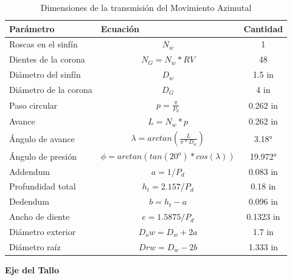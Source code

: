 \begin{table}[H]
	\centering
	\caption{Dimensiones de la transmisión del Movimiento Azimutal}
	\begin{tabular}{|l|c|c|}
		\hline
		\textbf{Parámetro} & \multicolumn{1}{l|}{\textbf{Ecuación}} & \multicolumn{1}{l|}{\textbf{Cantidad}} \\
		\hline \hline
		Roscas en el sinfín & $ N_w $ & 1 \\
		\hline
		Dientes de la corona & $ N_G = N_w * RV $ & 48 \\
		\hline
		Diámetro del sinfín & $ D_w $ & 1.5 in \\
		\hline
		Diámetro de la corona & $ D_G $ & 4 in \\
		\hline
		Paso circular & $ p = \frac{\pi}{P_d} $ & 0.262 in \\
		\hline
		Avance & $ L = N_w * p $ & 0.262 in \\
		\hline
		Ángulo de avance & $\lambda = arctan( \frac{L}{\pi * D_w} ) $ & 3.18° \\
		\hline
		Ángulo de presión & $ \phi = arctan(tan(20^o)*cos(\lambda)) $ & 19.972° \\
		\hline
		Addendum & $ a = 1/P_d $ & 0.083 in \\
		\hline
		Profundidad total & $ h_t = 2.157/P_d $ & 0.18 in \\
		\hline
		Dedendum & $ b = h_t - a $ & 0.096 in \\
		\hline
		Ancho de diente & $ e = 1.5875/P_d $ & 0.1323 in \\
		\hline
		Diámetro exterior & $ D_ow = D_w + 2a $ & 1.7 in \\
		\hline
		Diámetro raíz & $ Drw = D_w - 2b $ & 1.333 in \\
		\hline
	\end{tabular}%
	\label{tab:transZ}%
\end{table}%

\textbf{Eje del Tallo}


